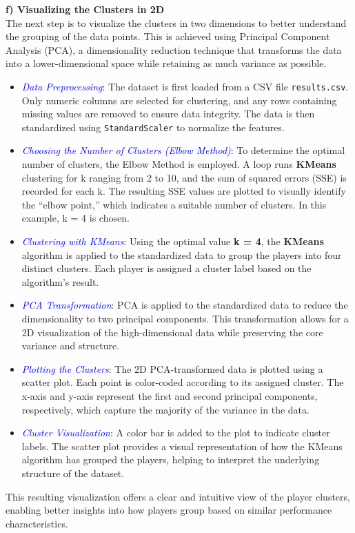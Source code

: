 \documentclass[a4paper,12pt]{article}
\begin{document}
\textbf{f) Visualizing the Clusters in 2D} \\
The next step is to visualize the clusters in two dimensions to better understand the grouping of the data points. This is achieved using Principal Component Analysis (PCA), a dimensionality reduction technique that transforms the data into a lower-dimensional space while retaining as much variance as possible.
\begin{itemize}
    \item \textit{\textcolor{blue}{Data Preprocessing}}: The dataset is first loaded from a CSV file \texttt{results.csv}. Only numeric columns are selected for clustering, and any rows containing missing values are removed to ensure data integrity. The data is then standardized using \texttt{StandardScaler} to normalize the features.
    \item \textit{\textcolor{blue}{Choosing the Number of Clusters (Elbow Method)}}: To determine the optimal number of clusters, the Elbow Method is employed. A loop runs \textbf{KMeans} clustering for k ranging from 2 to 10, and the sum of squared errors (SSE) is recorded for each k. The resulting SSE values are plotted to visually identify the “elbow point,” which indicates a suitable number of clusters. In this example, k = 4 is chosen.
    \item \textit{\textcolor{blue}{Clustering with KMeans}}: Using the optimal value \textbf{k = 4}, the \textbf{KMeans} algorithm is applied to the standardized data to group the players into four distinct clusters. Each player is assigned a cluster label based on the algorithm’s result.
    \item \textit{\textcolor{blue}{PCA Transformation}}: PCA is applied to the standardized data to reduce the dimensionality to two principal components. This transformation allows for a 2D visualization of the high-dimensional data while preserving the core variance and structure.
    \item \textit{\textcolor{blue}{Plotting the Clusters}}: The 2D PCA-transformed data is plotted using a scatter plot. Each point is color-coded according to its assigned cluster. The x-axis and y-axis represent the first and second principal components, respectively, which capture the majority of the variance in the data.
    \item \textit{\textcolor{blue}{Cluster Visualization}}: A color bar is added to the plot to indicate cluster labels. The scatter plot provides a visual representation of how the KMeans algorithm has grouped the players, helping to interpret the underlying structure of the dataset.
\end{itemize}
This resulting visualization offers a clear and intuitive view of the player clusters, enabling better insights into how players group based on similar performance characteristics.
\end{document}
